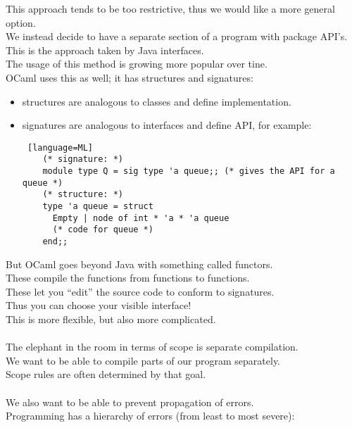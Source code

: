 \documentclass[../../lecture_notes.tex]{subfiles}
\begin{document}
This approach tends to be too restrictive, thus we would like a more general option.\\
We instead decide to have a separate section of a program with package API’s.\\
\indent This is the approach taken by Java interfaces.\\
\indent The usage of this method is growing more popular over tine.\\
\indent \indent OCaml uses this as well; it has structures and signatures:\\
		\begin{itemize} [itemsep=0mm]
			\item structures are analogous to classes and define implementation.
			\item signatures are analogous to interfaces and define API, for example:
				\begin{lstlisting} [language=ML]
	(* signature: *)
	module type Q = sig type 'a queue;; (* gives the API for a queue *)
	(* structure: *)
	type 'a queue = struct
	  Empty | node of int * 'a * 'a queue
	  (* code for queue *)
	end;;
				\end{lstlisting}
		\end{itemize}
\indent But OCaml goes beyond Java with something called functors.\\
\indent These compile the functions from functions to functions.\\
\indent These let you “edit” the source code to conform to signatures.\\
\indent Thus you can choose your visible interface!\\
\indent This is more flexible, but also more complicated.\\
\\
The elephant in the room in terms of scope is separate compilation.\\
	\indent We want to be able to compile parts of our program separately.\\
Scope rules are often determined by that goal.\\
\\
We also want to be able to prevent propagation of errors.\\
Programming has a hierarchy of errors (from least to most severe):\\
\end{document}
